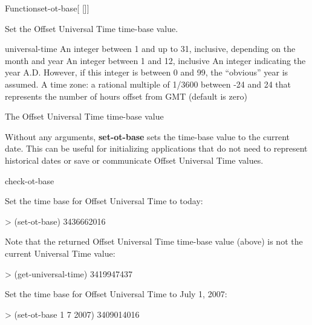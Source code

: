 \documentclass[10pt,twoside,english,pdftex]{article}
\begin{document}
\begin{functiondoc}{Function}{set-ot-base}{[
   []]
  \returns{} }
%

\fnsyntax

\fnpurpose Set the Offset Universal Time time-base value.

\fnpackage {}

\fnmodule {}

\fnargs
\begin{args}{universal-time}
  \arg[date] An integer between 1 and up to 31, inclusive, depending
  on the month and year
  \arg[month] An integer between 1 and 12, inclusive
  \arg[year] An integer indicating the year A.D. However, if this
  integer is between 0 and 99, the ``obvious'' year is assumed.
   A time zone: a rational multiple of 1/3600 between
  -24 and 24 that represents the number of hours offset from GMT 
  (default is zero)
\end{args}

\fnreturns The Offset Universal Time time-base value

\fndescription Without any arguments, \textbf{set-ot-base} sets the
time-base value to the current date.  This can be useful for
initializing applications that do not need to represent historical
dates or save or communicate Offset Universal Time values.

\begin{alsos}{check-ot-base}
\also[*ot-base*]
\also[ot2ut]
\also[ut2ot]
\end{alsos}

\fnexamples
Set the time base for Offset Universal Time to today:
%
\W\supp
\begin{example}
> (set-ot-base)
3436662016
\end{example}
Note that the returned Offset Universal Time time-base value (above) is not
the current Universal Time value:
%
\W\supp\notpretop
\begin{example}
> (get-universal-time)
3419947437
\end{example}

Set the time base for Offset Universal Time to July 1, 2007:
%
\W\supp
\begin{example}
> (set-ot-base 1 7 2007)
3409014016
\end{example}

\end{functiondoc}
\end{document}
